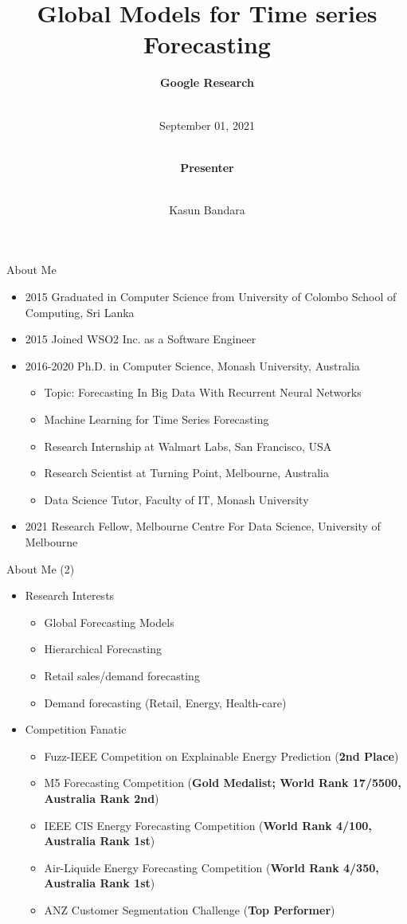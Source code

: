\documentclass{beamer}
\title[Global Models]{Global Models for Time series Forecasting}
\author[Kasun Bandara]{\textbf{Google Research} \and \\\vspace{2mm} \scriptsize September 01, 2021
\and \\\vspace{3mm} \textbf{\scriptsize Presenter} \and \\\vspace{2mm} Kasun Bandara
}
\institute{School of Computing and Information Systems \\\vspace{1mm} Melbourne Centre For Data Science \\\vspace{1mm} University of Melbourne}
\date[September 01, 2021]{}
\begin{document}
\begin{frame}[plain]
  \titlepage
\end{frame}

\begin{frame}{About Me}
\begin{itemize}
\item 2015 Graduated in Computer Science from University of Colombo School of Computing, Sri Lanka
\item 2015 Joined WSO2 Inc. as a Software Engineer
\item 2016-2020 Ph.D. in Computer Science, Monash University, Australia
 \begin{itemize}
  \item Topic: Forecasting In Big Data With Recurrent Neural Networks
  \item Machine Learning for Time Series Forecasting
  \item Research Internship at Walmart Labs, San Francisco, USA
  \item Research Scientist at Turning Point, Melbourne, Australia
  \item Data Science Tutor, Faculty of IT, Monash University
 \end{itemize}
\item 2021 Research Fellow, Melbourne Centre For Data Science, University of Melbourne
\end{itemize}
\end{frame}

\begin{frame}{About Me (2)}
\begin{itemize}
\item Research Interests
\begin{itemize}
 \item Global Forecasting Models
  \item Hierarchical Forecasting
  \item Retail sales/demand forecasting
  \item Demand forecasting (Retail, Energy, Health-care)
  \end{itemize}
\item Competition Fanatic
  \begin{itemize}
  \item Fuzz-IEEE Competition on Explainable Energy Prediction (\textbf{2nd Place})
  \item M5 Forecasting Competition (\textbf{Gold Medalist; World Rank 17/5500, Australia Rank 2nd})
  \item IEEE CIS Energy Forecasting Competition (\textbf{World Rank 4/100, Australia Rank 1st})
  \item Air-Liquide Energy Forecasting Competition (\textbf{World Rank 4/350, Australia Rank 1st})
  \item ANZ Customer Segmentation Challenge (\textbf{Top Performer})
  \end{itemize}
\end{itemize}
\end{frame}
\end{document}
